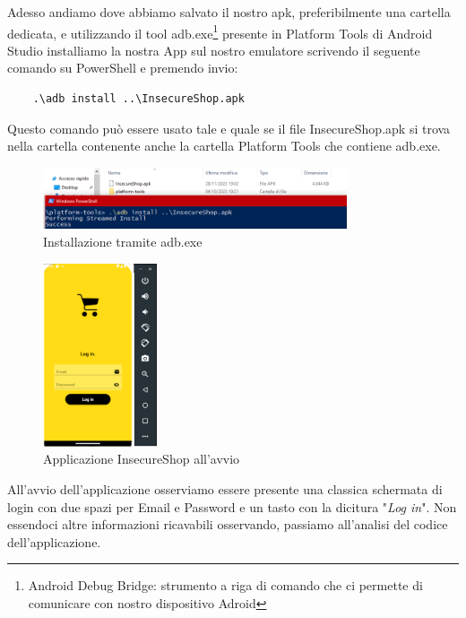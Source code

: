 \documentclass{article}
\begin{document}
Adesso andiamo dove abbiamo salvato il nostro apk, preferibilmente una cartella dedicata, e utilizzando il tool adb.exe\footnote{Android Debug Bridge: strumento a riga di comando che ci permette di comunicare con nostro dispositivo Adroid} 
presente in Platform Tools\cite{sdk} di Android Studio installiamo la nostra App sul nostro emulatore scrivendo il seguente comando su
PowerShell e premendo invio:
\begin{verbatim}
    .\adb install ..\InsecureShop.apk
\end{verbatim}
Questo comando può essere usato tale e quale se il file InsecureShop.apk si trova nella cartella contenente anche la cartella Platform Tools
 che contiene adb.exe.
 \begin{figure}[htp]
    \centering
    \includegraphics[width=0.8\textwidth]{./insecureshop/adbInstUse.png}
    \captionsetup{labelformat=empty}
    \caption{Installazione tramite adb.exe}
    \label{fig:installApp}
\end{figure}
\begin{figure}[htbp]
    \centering
    \includegraphics[width=0.30\textwidth]{./insecureshop/InsecureShopAvvio.png}
    \captionsetup{labelformat=empty}
    \caption{Applicazione InsecureShop all'avvio}
    \label{fig:InsecureShopStart}
\end{figure}

All'avvio dell'applicazione osserviamo essere presente una classica schermata di login con due spazi per Email e Password e un tasto con la 
dicitura "\textit{Log in}". Non essendoci altre informazioni ricavabili osservando, passiamo all'analisi del codice dell'applicazione.
\end{document}
